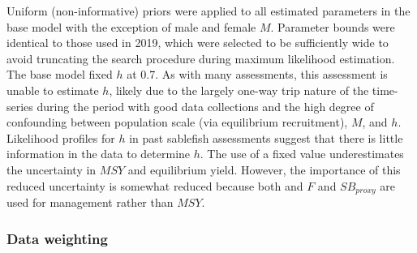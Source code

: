 \documentclass[11pt,
  english,
  a4paper,
]{article}
\begin{document}
\leavevmode\tagmcend\tagstructend


Uniform (non-informative) priors were applied to all estimated parameters in the base model with the exception of male and female {\(M\)\leavevmode\tagmcend\tagstructend}. Parameter bounds were identical to those used in 2019, which were selected to be sufficiently wide to avoid truncating the search procedure during maximum likelihood estimation. The base model fixed {\(h\)\leavevmode\tagmcend\tagstructend} at 0.7. As with many assessments, this assessment is unable to estimate {\(h\)\leavevmode\tagmcend\tagstructend}, likely due to the largely one-way trip nature of the time-series during the period with good data collections and the high degree of confounding between population scale (via equilibrium recruitment), {\(M\)\leavevmode\tagmcend\tagstructend}, and {\(h\)\leavevmode\tagmcend\tagstructend}. Likelihood profiles for {\(h\)\leavevmode\tagmcend\tagstructend} in past sablefish assessments suggest that there is little information in the data to determine {\(h\)\leavevmode\tagmcend\tagstructend}. The use of a fixed value underestimates the uncertainty in {\(MSY\)\leavevmode\tagmcend\tagstructend} and equilibrium yield. However, the importance of this reduced uncertainty is somewhat reduced because both and {\(F\)\leavevmode\tagmcend\tagstructend} and {\(SB_{proxy}\)\leavevmode\tagmcend\tagstructend} are used for management rather than {\(MSY\)\leavevmode\tagmcend\tagstructend}.

\leavevmode\tagmcend\tagstructend\par


\hypertarget{data-weighting}{%
\subsubsection{Data weighting}\label{data-weighting}}
\end{document}
